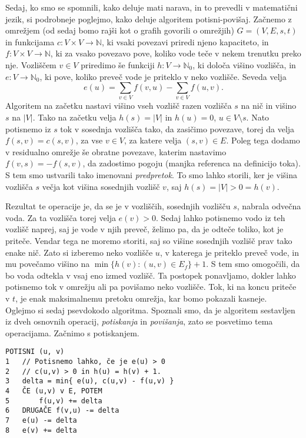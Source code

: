 \documentclass[mat1]{fmfdelo}
\newcommand{\N}{\mathbb N}
\begin{document}
Sedaj, ko smo se spomnili, kako deluje mati narava, in to prevedli v matematični jezik, si podrobneje poglejmo, kako deluje algoritem potisni-povišaj. Začnemo z omrežjem (od sedaj bomo rajši kot o grafih govorili o omrežjih) $G = (V, E, s, t)$ in funkcijama $c\colon V \times V \rightarrow \N$, ki vsaki povezavi priredi njeno kapaciteto, in $f\colon V \times V \rightarrow \N$, ki za vsako povezavo pove, koliko vode teče v nekem trenutku preko nje. Vozliščem $v \in V$ priredimo še funkciji $h\colon V \rightarrow \N_0$, ki določa višino vozlišča, in $e\colon V \rightarrow \N_0$, ki pove, koliko preveč vode je priteklo v neko vozlišče. Seveda velja \[e(u) = \sum_{v \in V} f(v,u) - \sum_{v \in V} f(u,v).\] Algoritem na začetku nastavi višino vseh vozlišč razen vozlišča $s$ na nič in višino $s$ na $|V|$. Tako na začetku velja $h(s) = |V|$ in $h(u) = 0$, $u \in V \setminus {s}$. Nato potisnemo iz $s$ tok v sosednja vozlišča tako, da zasičimo povezave, torej da velja $f(s, v) = c(s, v)$, za vse $v \in V$, za katere velja $(s, v) \in E$. Poleg tega dodamo v residualno omrežje še obratne povezave, katerim nastavimo $f(v,s) = -f(s,v)$, da zadostimo pogoju (manjka referenca na definicijo toka). S tem smo ustvarili tako imenovani \textit{predpretok}. To smo lahko storili, ker je višina vozlišča $s$ večja kot višina sosednjih vozlišč $v$, saj $h(s) = |V| > 0 = h(v)$.

Rezultat te operacije je, da se je v vozliščih, sosednjih vozlišču $s$, nabrala odvečna voda. Za ta vozlišča torej velja $e(v) > 0$. Sedaj lahko potisnemo vodo iz teh vozlišč naprej, saj je vode v njih preveč, želimo pa, da je odteče toliko, kot je priteče. Vendar tega ne moremo storiti, saj so višine sosednjih vozlišč prav tako enake nič. Zato si izberemo neko vozlišče $u$, v katerega je priteklo preveč vode, in mu povečamo višino na $\min\{h(v) : (u,v) \in E_f\} + 1$. S tem smo omogočili, da bo voda odtekla v vsaj eno izmed vozlišč. Ta postopek ponavljamo, dokler lahko potisnemo tok v omrežju ali pa povišamo neko vozlišče. Tok, ki na koncu priteče v $t$, je enak maksimalnemu pretoku omrežja, kar bomo pokazali kasneje.\\

Oglejmo si sedaj psevdokodo algoritma. Spoznali smo, da je algoritem sestavljen iz dveh osnovnih operacij, \textit{potiskanja} in \textit{povišanja}, zato se posvetimo tema operacijama. Začnimo s potiskanjem.\\

\begin{verbatim}
POTISNI (u, v)
1   // Potisnemo lahko, če je e(u) > 0
2   // c(u,v) > 0 in h(u) = h(v) + 1.
3   delta = min{ e(u), c(u,v) - f(u,v) }
4   ČE (u,v) v E, POTEM
5       f(u,v) += delta
6   DRUGAČE f(v,u) -= delta
7   e(u) -= delta
8   e(v) += delta
\end{verbatim}~
\end{document}
